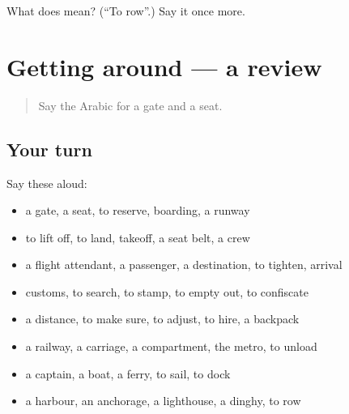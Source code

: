\begin{tcolorbox}[breakable,colback=teal!4,colframe=teal!35!black,title={Before you move on}]
What does  mean? (\textquotedblleft{}To row\textquotedblright{}.) Say it once more.
\end{tcolorbox}
\section[(dialogue)]{Getting around — a review}

\label{lesson:AR-R430-review-423-430}



\begin{quote}
Say the Arabic for a gate and a seat.
\end{quote}

\subsection*{Your turn}
Say these aloud:

\begin{itemize}
\raggedright
  \item a gate, a seat, to reserve, boarding, a runway
  \item to lift off, to land, takeoff, a seat belt, a crew
  \item a flight attendant, a passenger, a destination, to tighten, arrival
  \item customs, to search, to stamp, to empty out, to confiscate
  \item a distance, to make sure, to adjust, to hire, a backpack
  \item a railway, a carriage, a compartment, the metro, to unload
  \item a captain, a boat, a ferry, to sail, to dock
  \item a harbour, an anchorage, a lighthouse, a dinghy, to row
\end{itemize}

